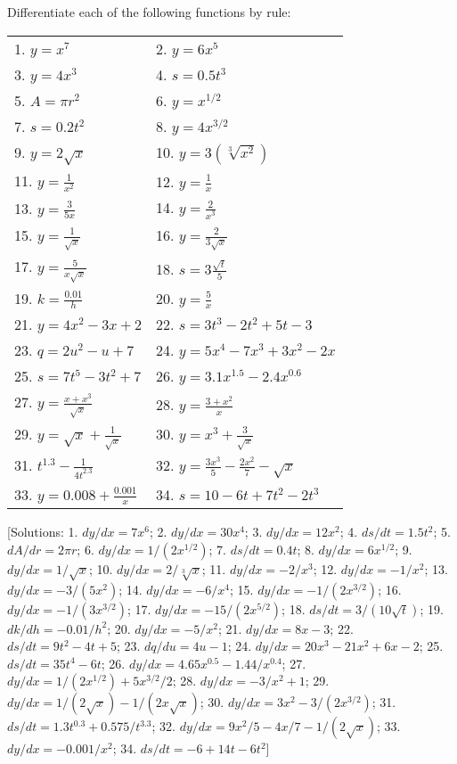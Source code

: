 \documentclass[
  11pt,
  oneside]{book}
\newcommand{\slide}{}
\theoremstyle{definition}
\theoremstyle{definition}
\theoremstyle{definition}
\theoremstyle{definition}
\theoremstyle{remark}
\begin{document}
Differentiate each of the following functions by rule:

\begin{tabular}{l|l}
\hline
 & \\
\hline
1. $y=x^7$ & 2. $y=6x^5$\\
\hline
3. $y=4x^3$ & 4. $s=0.5t^3$\\
\hline
5. $A=\pi r^2$ & 6. $y=x^{1/2}$\\
\hline
7. $s=0.2t^2$ & 8. $y=4x^{3/2}$\\
\hline
9. $y=2\sqrt{x}$ & 10. $y=3(\sqrt[3]{x^2})$\\
\hline
11. $y=\frac1{x^2}$ & 12. $y=\frac 1x$\\
\hline
13. $y=\frac3{5x}$ & 14. $y=\frac2{x^3}$\\
\hline
15. $y=\frac1{\sqrt{x}}$ & 16. $y=\frac2{3\sqrt{x}}$\\
\hline
17. $y=\frac5{x\sqrt{x}}$ & 18. $s=3\frac{\sqrt{t}}5$\\
\hline
19. $k=\frac{0.01}{h}$ & 20. $y=\frac5x$\\
\hline
21. $y=4x^2-3x+2$ & 22. $s=3t^3-2t^2+5t-3$\\
\hline
23. $q=2u^2-u+7$ & 24. $y=5x^4-7x^3+3x^2-2x$\\
\hline
25. $s=7t^5-3t^2+7$ & 26. $y=3.1x^{1.5}-2.4x^{0.6}$\\
\hline
27. $y=\frac{x+x^3}{\sqrt{x}}$ & 28. $y=\frac{3+x^2}x$\\
\hline
29. $y=\sqrt{x}+\frac1{\sqrt{x}}$ & 30. $y=x^3+\frac3{\sqrt{x}}$\\
\hline
31. $t^{1.3}-\frac1{4t^{2.3}}$ & 32. $y=\frac{3x^3}5-\frac{2x^2}7-\sqrt{x}$\\
\hline
33. $y=0.008+\frac{0.001}{x}$ & 34. $s=10-6t+7t^2-2t^3$\\
\hline
\end{tabular}
\slide

{[}Solutions: 1. \(dy/dx=7x^6\); 2. \(dy/dx=30x^4\); 3. \(dy/dx=12x^2\); 4. \(ds/dt=1.5t^2\); 5. \(dA/dr=2\pi r\); 6. \(dy/dx=1/(2x^{1/2})\); 7. \(ds/dt=0.4t\); 8. \(dy/dx=6x^{1/2}\); 9. \(dy/dx=1/\sqrt{x}\); 10. \(dy/dx=2/\sqrt[3]{x}\); 11. \(dy/dx=-2/x^3\); 12. \(dy/dx=-1/x^2\); 13. \(dy/dx=-3/(5x^2)\); 14. \(dy/dx=-6/x^4\); 15. \(dy/dx=-1/(2x^{3/2})\); 16. \(dy/dx=-1/(3x^{3/2})\); 17. \(dy/dx=-15/(2x^{5/2})\); 18. \(ds/dt=3/(10\sqrt{t})\); 19. \(dk/dh=-0.01/h^2\); 20. \(dy/dx=-5/x^2\); 21. \(dy/dx=8x-3\); 22. \(ds/dt=9t^2-4t+5\); 23. \(dq/du=4u-1\); 24. \(dy/dx=20x^3-21x^2+6x-2\); 25. \(ds/dt=35t^4-6t\); 26. \(dy/dx=4.65x^{0.5}-1.44/x^{0.4}\); 27. \(dy/dx=1/(2x^{1/2})+5x^{3/2}/2\); 28. \(dy/dx=-3/x^2+1\); 29. \(dy/dx=1/(2\sqrt{x})-1/(2x\sqrt{x})\); 30. \(dy/dx=3x^2-3/(2x^{3/2})\); 31. \(ds/dt=1.3t^{0.3}+0.575/t^{3.3}\); 32. \(dy/dx=9x^2/5-4x/7-1/(2\sqrt{x})\); 33. \(dy/dx=-0.001/x^2\); 34. \(ds/dt=-6+14t-6t^2\){]}
\end{document}
